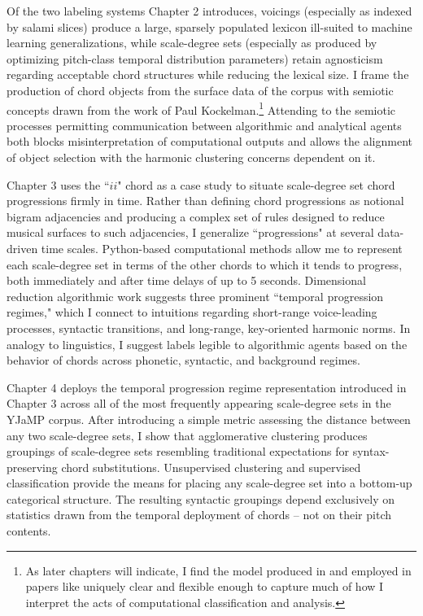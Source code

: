 Of the two labeling systems Chapter 2 introduces, voicings (especially as indexed by salami slices) produce a large, sparsely populated lexicon ill-suited to machine learning generalizations, while scale-degree sets (especially as produced by optimizing pitch-class temporal distribution parameters) retain agnosticism regarding acceptable chord structures while reducing the lexical size.  I frame the production of chord objects from the surface data of the corpus with semiotic concepts drawn from the work of Paul Kockelman.\footnote{As later chapters will indicate, I find the model produced in \cite{kockelman2013} and employed in papers like \cite{kockelman2013anthropology} uniquely clear and flexible enough to capture much of how I interpret the acts of computational classification and analysis.}  Attending to the semiotic processes permitting communication between algorithmic and analytical agents both blocks misinterpretation of computational outputs and allows the alignment of object selection with the harmonic clustering concerns dependent on it.

Chapter 3 uses the ``$ii$" chord as a case study to situate scale-degree set chord progressions firmly in time.  Rather than defining chord progressions as notional bigram adjacencies and producing a complex set of rules designed to reduce musical surfaces to such adjacencies, I generalize ``progressions" at several data-driven time scales.  Python-based computational methods allow me to represent each scale-degree set in terms of the other chords to which it tends to progress, both immediately and after time delays of up to 5 seconds.  Dimensional reduction algorithmic work suggests three prominent ``temporal progression regimes," which I connect to intuitions regarding short-range voice-leading processes, syntactic transitions, and long-range, key-oriented harmonic norms.  In analogy to linguistics, I suggest labels legible to algorithmic agents based on the behavior of chords across phonetic, syntactic, and background regimes.

Chapter 4 deploys the temporal progression regime representation introduced in Chapter 3 across all of the most frequently appearing scale-degree sets in the YJaMP corpus.  After introducing a simple metric assessing the distance between any two scale-degree sets, I show that agglomerative clustering produces groupings of scale-degree sets resembling traditional expectations for syntax-preserving chord substitutions.  Unsupervised clustering and supervised classification provide the means for placing any scale-degree set into a bottom-up categorical structure.  The resulting syntactic groupings depend exclusively on statistics drawn from the temporal deployment of chords -- not on their pitch contents.

